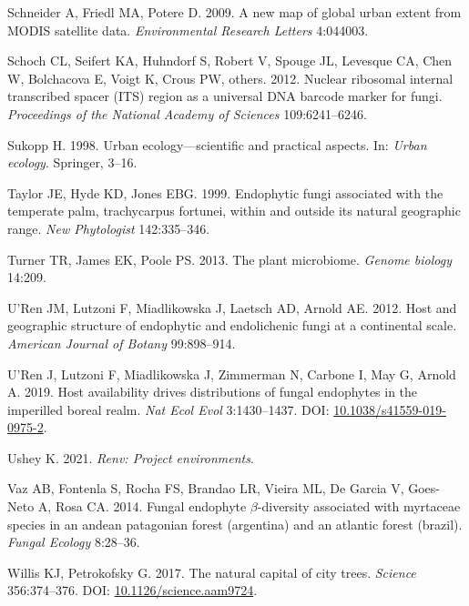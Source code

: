 \documentclass[fleqn,10pt,lineno]{wlpeerj} %
\newlength{\cslhangindent}
\newenvironment{CSLReferences}[2] %
 {%
  \setlength{\parindent}{0pt}
  \ifodd #1 \everypar{\setlength{\hangindent}{\cslhangindent}}\ignorespaces\fi
  \ifnum #2 > 0
  \setlength{\parskip}{#2\baselineskip}
  \fi
 }%
 {}
\begin{document}
\begin{CSLReferences}{1}{0}
\leavevmode{}%
Schneider A, Friedl MA, Potere D. 2009. A new map of global urban extent from MODIS satellite data. \emph{Environmental Research Letters} 4:044003.

\leavevmode{}%
Schoch CL, Seifert KA, Huhndorf S, Robert V, Spouge JL, Levesque CA, Chen W, Bolchacova E, Voigt K, Crous PW, others. 2012. Nuclear ribosomal internal transcribed spacer (ITS) region as a universal DNA barcode marker for fungi. \emph{Proceedings of the National Academy of Sciences} 109:6241--6246.

\leavevmode{}%
Sukopp H. 1998. Urban ecology---scientific and practical aspects. In: \emph{Urban ecology}. Springer, 3--16.

\leavevmode{}%
Taylor JE, Hyde KD, Jones EBG. 1999. Endophytic fungi associated with the temperate palm, trachycarpus fortunei, within and outside its natural geographic range. \emph{New Phytologist} 142:335--346.

\leavevmode{}%
Turner TR, James EK, Poole PS. 2013. The plant microbiome. \emph{Genome biology} 14:209.

\leavevmode{}%
U'Ren JM, Lutzoni F, Miadlikowska J, Laetsch AD, Arnold AE. 2012. Host and geographic structure of endophytic and endolichenic fungi at a continental scale. \emph{American Journal of Botany} 99:898--914.

\leavevmode{}%
U'Ren J, Lutzoni F, Miadlikowska J, Zimmerman N, Carbone I, May G, Arnold A. 2019. Host availability drives distributions of fungal endophytes in the imperilled boreal realm. \emph{Nat Ecol Evol} 3:1430--1437. DOI: \href{https://doi.org/10.1038/s41559-019-0975-2}{10.1038/s41559-019-0975-2}.

\leavevmode{}%
Ushey K. 2021. \emph{Renv: Project environments}.

\leavevmode{}%
Vaz AB, Fontenla S, Rocha FS, Brandao LR, Vieira ML, De Garcia V, Goes-Neto A, Rosa CA. 2014. Fungal endophyte \(\beta\)-diversity associated with myrtaceae species in an andean patagonian forest (argentina) and an atlantic forest (brazil). \emph{Fungal Ecology} 8:28--36.

\leavevmode{}%
Willis KJ, Petrokofsky G. 2017. The natural capital of city trees. \emph{Science} 356:374--376. DOI: \href{https://doi.org/10.1126/science.aam9724}{10.1126/science.aam9724}.


\end{CSLReferences}
\end{document}
